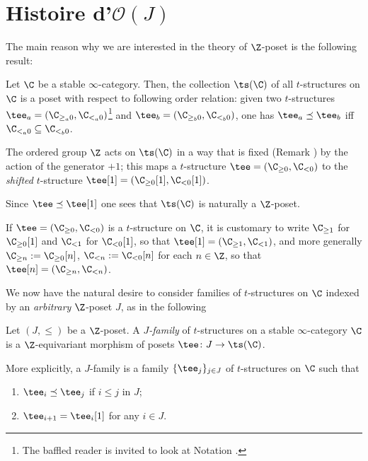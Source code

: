\section{Histoire d'\texorpdfstring{$\mathcal{O}(J)$}{(J)}}
The main reason why we are interested in the theory of $\Z $-poset is the following result:
\begin{remark}\label{slicing.cotow}
Let $\C$ be a stable $\infty$-category. Then, the collection $\ts(\C)$ of all $t$-structures on $\C$ is a poset with respect to following order relation: given two $t$-structures $\tee_a=(\C_{\ge_a 0}, \C_{<_a0})$\footnote{The baffled reader is invited to look at Notation .} and  $\tee_b=(\C_{\ge_b 0}, \C_{<_b0})$, one has  $\tee_a \preceq \tee_b$ iff $\C_{<_a0}\subseteq \C_{<_b0}$. 

The ordered group $\Z $ acts on $\ts(\C)$ in a way that is fixed (Remark ) by the action of the generator $+1$; this maps a $t$-structure $\tee=(\C_{\geq 0},\C_{<0})$ to the \emph{shifted} $t$-structure $\tee[1]=(\C_{\geq 0}[1],\C_{<0}[1])$.

Since $\tee\preceq\tee[1]$ one sees that $\ts(\C)$ is naturally a $\Z $-poset.%
\end{remark}
\begin{notat}\label{avoid.cumbersomeness}
If $\tee=(\C_{\geq 0},\C_{<0})$ is a $t$-structure on $\C$, it is customary to write $\C_{\geq 1}$ for $\C_{\geq 0}[1]$ and $\C_{<1}$ for $\C_{<0}[1]$, so that $\tee[1]=(\C_{\geq 1},\C_{<1})$, and more generally $\C_{\ge n} := \C_{\ge 0}[n]$, $\C_{<n} := \C_{<0}[n]$ for each $n\in\Z$, so that $\tee[n]=(\C_{\geq n},\C_{<n})$.
\end{notat}
We now have the natural desire to consider families of $t$-structures on $\C$ indexed by an \emph{arbitrary} $\Z $-poset $J$, as in the following
\begin{definition}
Let $(J,\leq)$ be a $\Z $-poset. A \emph{$J$-family} of $t$-structures on a stable $\infty$-category $\C$ is a $\Z $-equivariant morphism of posets $\tee\colon J\to \ts(\C)$.
 \end{definition}
 More explicitly, a $J$-family is a family $\{\tee_j\}_{j\in J}$ of $t$-structures on $\C$ such that
 \begin{enumerate}
\item $\tee_i\preceq \tee_j$ if $i\leq j$ in $J$;
\item $\tee_{i+1}=\tee_i[1]$ for any $i\in J$.
 \end{enumerate}
